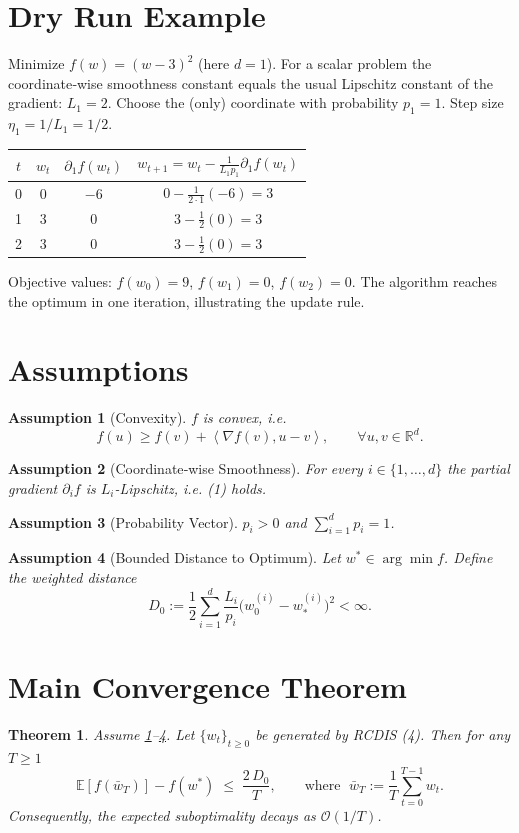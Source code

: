 \documentclass[11pt]{article}
\newtheorem{theorem}{Theorem}
\newtheorem{assumption}{Assumption}
\newcommand{\E}{\mathbb{E}}
\newcommand{\R}{\mathbb{R}}
\newcommand{\ip}[2]{\left\langle #1,#2\right\rangle}
\begin{document}
\section*{Dry Run Example}
Minimize \(f(w)=(w-3)^{2}\) (here \(d=1\)).  
For a scalar problem the coordinate‑wise smoothness constant equals the usual Lipschitz constant of the gradient: \(L_{1}=2\).  
Choose the (only) coordinate with probability \(p_{1}=1\).  
Step size \(\eta_{1}=1/L_{1}=1/2\).  

\begin{tabular}{c|c|c|c}
$t$ & $w_{t}$ & $\partial_{1}f(w_{t})$ & $w_{t+1}=w_{t}-\frac{1}{L_{1}p_{1}}\partial_{1}f(w_{t})$\\\hline
0 & $0$ & $-6$ & $0-\frac{1}{2\cdot1}(-6)=3$\\
1 & $3$ & $0$  & $3-\frac{1}{2}(0)=3$\\
2 & $3$ & $0$  & $3-\frac{1}{2}(0)=3$
\end{tabular}

Objective values: $f(w_{0})=9$, $f(w_{1})=0$, $f(w_{2})=0$.  
The algorithm reaches the optimum in one iteration, illustrating the update rule.

\newpage

\section*{Assumptions}
\begin{assumption}[Convexity]\label{ass:convex}
\(f\) is convex, i.e.
\[
    f(u)\ge f(v)+\ip{\nabla f(v)}{u-v},\qquad\forall u,v\in\R^{d}.
\tag{5}
\]
\end{assumption}
\begin{assumption}[Coordinate‑wise Smoothness]\label{ass:smooth}
For every \(i\in\{1,\dots ,d\}\) the partial gradient \(\partial_{i}f\) is \(L_{i}\)-Lipschitz, i.e. (1) holds.
\end{assumption}
\begin{assumption}[Probability Vector]\label{ass:prob}
\(p_{i}>0\) and \(\sum_{i=1}^{d}p_{i}=1\).
\end{assumption}
\begin{assumption}[Bounded Distance to Optimum]\label{ass:bound}
Let \(w^{*}\in\arg\min f\). Define the weighted distance
\[
    D_{0}:=\frac12\sum_{i=1}^{d}\frac{L_{i}}{p_{i}}\bigl(w_{0}^{(i)}-w_{*}^{(i)}\bigr)^{2}<\infty .
\tag{6}
\]
\end{assumption}

\section*{Main Convergence Theorem}
\begin{theorem}\label{thm:rate}
Assume \ref{ass:convex}–\ref{ass:bound}. Let \(\{w_{t}\}_{t\ge0}\) be generated by RCDIS (4). Then for any \(T\ge1\)
\[
    \E\!\left[f(\bar w_{T})\right]-f(w^{*})
    \;\le\;
    \frac{2\,D_{0}}{T},
\qquad\text{where }\;
\bar w_{T}:=\frac1T\sum_{t=0}^{T-1}w_{t}.
\tag{7}
\]
Consequently, the expected suboptimality decays as \(\mathcal{O}(1/T)\).
\end{theorem}
\end{document}
